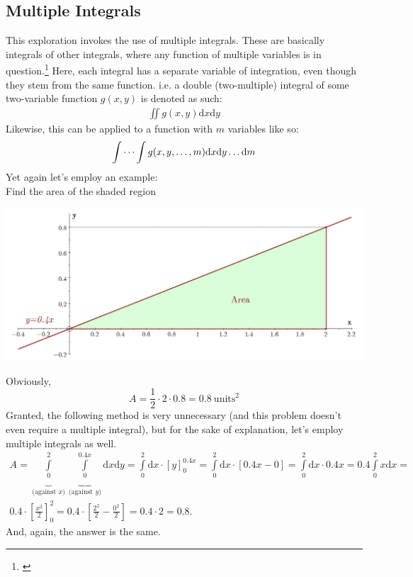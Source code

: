 \documentclass[11pt,a4paper]{article}
\numberwithin{equation}{subsection}
\begin{document}
\subsection{Multiple Integrals} \label{multiint}
This exploration invokes the use of multiple integrals. These are basically integrals of other integrals, where any function of multiple variables is in question.\footnote{\cite{stewart_2008_int}} Here, each integral has a separate variable of integration, even though they stem from the same function. i.e. a double (two-multiple) integral of some two-variable function $g(x,y)$ is denoted as such:
\begin{gather*}
\iint g(x,y) \mathrm{d}x\mathrm{d}y
\end{gather*}
Likewise, this can be applied to a function with $m$ variables like so:
\begin{gather*}
\idotsint g(x,y,\dots,m) \mathrm{d}x\mathrm{d}y \dots \mathrm{d}m
\end{gather*}
Yet again let's employ an example: \\
Find the area of the shaded region\\
\begin{center}
\includegraphics[scale=0.3]{updated/int}
\end{center}
Obviously, $$A=\frac{1}{2}\cdot 2 \cdot 0.8 = 0.8 \ \text{units}^{2}$$ Granted, the following method is very unnecessary (and this problem doesn't even require a multiple integral), but for the sake of explanation, let's employ multiple integrals as well.
\begin{gather*}
A = \underbrace{\int\limits_{0}^{2}}_{\text{(against } x\text{)}} \underbrace{\int\limits_{0}^{0.4x}}_{\text{(against } y\text{)}} \mathrm{d}x \mathrm{d}y =  \int\limits_{0}^{2} \mathrm{d}x \cdot \left[ y \right]_{0}^{0.4x} =  \int\limits_{0}^{2} \mathrm{d}x \cdot  \left[ 0.4x - 0 \right] = \int\limits_{0}^{2} \mathrm{d}x \cdot 0.4x = 0.4 \int\limits_{0}^{2} x\mathrm{d}x = \\
0.4 \cdot \left[ \frac{x^{2}}{2} \right]_{0}^{2} = 0.4 \cdot \left[ \frac{2^{2}}{2} - \frac{0^{2}}{2} \right] = 0.4 \cdot 2 = 0.8.
\end{gather*}
And, again, the answer is the same.
\end{document}
